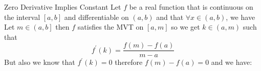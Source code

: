 \begin{proposition}{Zero Derivative Implies Constant}
  Let $f$ be a real function that is continuous on the interval $ \left[ a, b \right]$ and differentiable on $ \left(  a, b \right)$ and that $\forall x \in \left( a , b \right)$, we have 
    Let $m \in \left( a, b \right]$ then $f$ satisfies the MVT on $ \left[ a, m \right]$ so we get $k \in \left( a, m \right)$ such that 
    \[
    f ^{\prime}\left(k\right) = \frac{f\left(m\right)  -  f\left(a\right)}{m  -  a}
    \]
    But also we know that $f ^{\prime}\left(k\right) = 0$ therefore $f\left(m\right)  -  f\left(a\right) = 0$ and we have:
\end{proposition}




